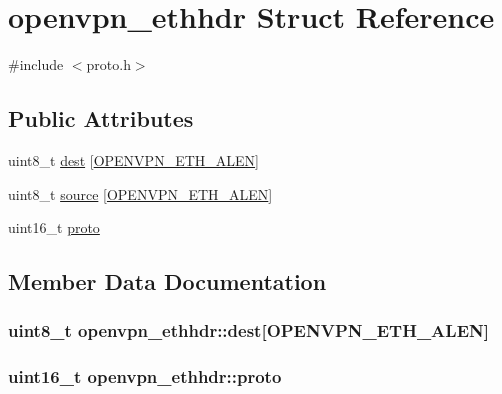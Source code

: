 \hypertarget{structopenvpn__ethhdr}{}\section{openvpn\+\_\+ethhdr Struct Reference}
\label{structopenvpn__ethhdr}


{\ttfamily \#include $<$proto.\+h$>$}

\subsection*{Public Attributes}
\begin{DoxyCompactItemize}
\item 
uint8\+\_\+t \hyperlink{structopenvpn__ethhdr_a8d3adcb861e061d01299d39c971312be}{dest} \mbox{[}\hyperlink{proto_8h_a6324dad6dba94d99632f089372acde4a}{O\+P\+E\+N\+V\+P\+N\+\_\+\+E\+T\+H\+\_\+\+A\+L\+E\+N}\mbox{]}
\item 
uint8\+\_\+t \hyperlink{structopenvpn__ethhdr_aff8e5e6757fd80a747923c1e3da09898}{source} \mbox{[}\hyperlink{proto_8h_a6324dad6dba94d99632f089372acde4a}{O\+P\+E\+N\+V\+P\+N\+\_\+\+E\+T\+H\+\_\+\+A\+L\+E\+N}\mbox{]}
\item 
uint16\+\_\+t \hyperlink{structopenvpn__ethhdr_abca31aa13fa0af872b8bb7f809d1eea9}{proto}
\end{DoxyCompactItemize}


\subsection{Member Data Documentation}
\hypertarget{structopenvpn__ethhdr_a8d3adcb861e061d01299d39c971312be}{}
\subsubsection[{dest}]{\setlength{\rightskip}{0pt plus 5cm}uint8\+\_\+t openvpn\+\_\+ethhdr\+::dest\mbox{[}{\bf O\+P\+E\+N\+V\+P\+N\+\_\+\+E\+T\+H\+\_\+\+A\+L\+E\+N}\mbox{]}}\label{structopenvpn__ethhdr_a8d3adcb861e061d01299d39c971312be}
\hypertarget{structopenvpn__ethhdr_abca31aa13fa0af872b8bb7f809d1eea9}{}
\subsubsection[{proto}]{\setlength{\rightskip}{0pt plus 5cm}uint16\+\_\+t openvpn\+\_\+ethhdr\+::proto}\label{structopenvpn__ethhdr_abca31aa13fa0af872b8bb7f809d1eea9}
\hypertarget{structopenvpn__ethhdr_aff8e5e6757fd80a747923c1e3da09898}{}
